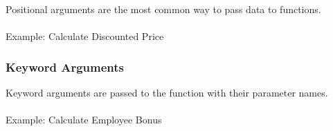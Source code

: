 \documentclass[
  letterpaper,
  DIV=11,
  numbers=noendperiod]{scrreprt}
\makeatletter
\let\oldparagraph\paragraph
\renewcommand{\paragraph}{
    \@ifstar
      \xxxParagraphStar
      \xxxParagraphNoStar
  }
\newcommand{\xxxParagraphStar}[1]{\oldparagraph*{#1}\mbox{}}
\newcommand{\xxxParagraphNoStar}[1]{\oldparagraph{#1}\mbox{}}
\newenvironment{Shaded}{\begin{snugshade}}{\end{snugshade}}
\newcommand{\BuiltInTok}[1]{\textcolor[rgb]{0.00,0.23,0.31}{#1}}
\newcommand{\CommentTok}[1]{\textcolor[rgb]{0.37,0.37,0.37}{#1}}
\newcommand{\ControlFlowTok}[1]{\textcolor[rgb]{0.00,0.23,0.31}{\textbf{#1}}}
\newcommand{\DecValTok}[1]{\textcolor[rgb]{0.68,0.00,0.00}{#1}}
\newcommand{\FloatTok}[1]{\textcolor[rgb]{0.68,0.00,0.00}{#1}}
\newcommand{\KeywordTok}[1]{\textcolor[rgb]{0.00,0.23,0.31}{\textbf{#1}}}
\newcommand{\NormalTok}[1]{\textcolor[rgb]{0.00,0.23,0.31}{#1}}
\newcommand{\OperatorTok}[1]{\textcolor[rgb]{0.37,0.37,0.37}{#1}}
\newcommand{\SpecialCharTok}[1]{\textcolor[rgb]{0.37,0.37,0.37}{#1}}
\newcommand{\SpecialStringTok}[1]{\textcolor[rgb]{0.13,0.47,0.30}{#1}}
\makeatother
\begin{document}
Positional arguments are the most common way to pass data to functions.

\paragraph{Example: Calculate Discounted
Price}\label{example-calculate-discounted-price}

\begin{Shaded}
\end{Shaded}

\subsubsection{Keyword Arguments}\label{keyword-arguments}

Keyword arguments are passed to the function with their parameter names.

\paragraph{Example: Calculate Employee
Bonus}\label{example-calculate-employee-bonus}
\end{document}
